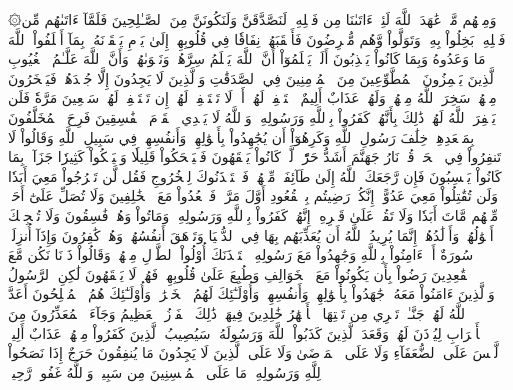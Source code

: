 ۞وَمِنۡهُم مَّنۡ عَٰهَدَ ٱللَّهَ لَئِنۡ ءَاتَىٰنَا مِن فَضۡلِهِۦ لَنَصَّدَّقَنَّ وَلَنَكُونَنَّ مِنَ ٱلصَّـٰلِحِينَ
فَلَمَّآ ءَاتَىٰهُم مِّن فَضۡلِهِۦ بَخِلُواْ بِهِۦ وَتَوَلَّواْ وَّهُم مُّعۡرِضُونَ
فَأَعۡقَبَهُمۡ نِفَاقٗا فِي قُلُوبِهِمۡ إِلَىٰ يَوۡمِ يَلۡقَوۡنَهُۥ بِمَآ أَخۡلَفُواْ ٱللَّهَ مَا وَعَدُوهُ وَبِمَا كَانُواْ يَكۡذِبُونَ
أَلَمۡ يَعۡلَمُوٓاْ أَنَّ ٱللَّهَ يَعۡلَمُ سِرَّهُمۡ وَنَجۡوَىٰهُمۡ وَأَنَّ ٱللَّهَ عَلَّـٰمُ ٱلۡغُيُوبِ
ٱلَّذِينَ يَلۡمِزُونَ ٱلۡمُطَّوِّعِينَ مِنَ ٱلۡمُؤۡمِنِينَ فِي ٱلصَّدَقَٰتِ وَٱلَّذِينَ لَا يَجِدُونَ إِلَّا جُهۡدَهُمۡ فَيَسۡخَرُونَ مِنۡهُمۡ سَخِرَ ٱللَّهُ مِنۡهُمۡ وَلَهُمۡ عَذَابٌ أَلِيمٌ
ٱسۡتَغۡفِرۡ لَهُمۡ أَوۡ لَا تَسۡتَغۡفِرۡ لَهُمۡ إِن تَسۡتَغۡفِرۡ لَهُمۡ سَبۡعِينَ مَرَّةٗ فَلَن يَغۡفِرَ ٱللَّهُ لَهُمۡۚ ذَٰلِكَ بِأَنَّهُمۡ كَفَرُواْ بِٱللَّهِ وَرَسُولِهِۦۗ وَٱللَّهُ لَا يَهۡدِي ٱلۡقَوۡمَ ٱلۡفَٰسِقِينَ
فَرِحَ ٱلۡمُخَلَّفُونَ بِمَقۡعَدِهِمۡ خِلَٰفَ رَسُولِ ٱللَّهِ وَكَرِهُوٓاْ أَن يُجَٰهِدُواْ بِأَمۡوَٰلِهِمۡ وَأَنفُسِهِمۡ فِي سَبِيلِ ٱللَّهِ وَقَالُواْ لَا تَنفِرُواْ فِي ٱلۡحَرِّۗ قُلۡ نَارُ جَهَنَّمَ أَشَدُّ حَرّٗاۚ لَّوۡ كَانُواْ يَفۡقَهُونَ
فَلۡيَضۡحَكُواْ قَلِيلٗا وَلۡيَبۡكُواْ كَثِيرٗا جَزَآءَۢ بِمَا كَانُواْ يَكۡسِبُونَ
فَإِن رَّجَعَكَ ٱللَّهُ إِلَىٰ طَآئِفَةٖ مِّنۡهُمۡ فَٱسۡتَـٔۡذَنُوكَ لِلۡخُرُوجِ فَقُل لَّن تَخۡرُجُواْ مَعِيَ أَبَدٗا وَلَن تُقَٰتِلُواْ مَعِيَ عَدُوًّاۖ إِنَّكُمۡ رَضِيتُم بِٱلۡقُعُودِ أَوَّلَ مَرَّةٖ فَٱقۡعُدُواْ مَعَ ٱلۡخَٰلِفِينَ
وَلَا تُصَلِّ عَلَىٰٓ أَحَدٖ مِّنۡهُم مَّاتَ أَبَدٗا وَلَا تَقُمۡ عَلَىٰ قَبۡرِهِۦٓۖ إِنَّهُمۡ كَفَرُواْ بِٱللَّهِ وَرَسُولِهِۦ وَمَاتُواْ وَهُمۡ فَٰسِقُونَ
وَلَا تُعۡجِبۡكَ أَمۡوَٰلُهُمۡ وَأَوۡلَٰدُهُمۡۚ إِنَّمَا يُرِيدُ ٱللَّهُ أَن يُعَذِّبَهُم بِهَا فِي ٱلدُّنۡيَا وَتَزۡهَقَ أَنفُسُهُمۡ وَهُمۡ كَٰفِرُونَ
وَإِذَآ أُنزِلَتۡ سُورَةٌ أَنۡ ءَامِنُواْ بِٱللَّهِ وَجَٰهِدُواْ مَعَ رَسُولِهِ ٱسۡتَـٔۡذَنَكَ أُوْلُواْ ٱلطَّوۡلِ مِنۡهُمۡ وَقَالُواْ ذَرۡنَا نَكُن مَّعَ ٱلۡقَٰعِدِينَ
رَضُواْ بِأَن يَكُونُواْ مَعَ ٱلۡخَوَالِفِ وَطُبِعَ عَلَىٰ قُلُوبِهِمۡ فَهُمۡ لَا يَفۡقَهُونَ
لَٰكِنِ ٱلرَّسُولُ وَٱلَّذِينَ ءَامَنُواْ مَعَهُۥ جَٰهَدُواْ بِأَمۡوَٰلِهِمۡ وَأَنفُسِهِمۡۚ وَأُوْلَـٰٓئِكَ لَهُمُ ٱلۡخَيۡرَٰتُۖ وَأُوْلَـٰٓئِكَ هُمُ ٱلۡمُفۡلِحُونَ
أَعَدَّ ٱللَّهُ لَهُمۡ جَنَّـٰتٖ تَجۡرِي مِن تَحۡتِهَا ٱلۡأَنۡهَٰرُ خَٰلِدِينَ فِيهَاۚ ذَٰلِكَ ٱلۡفَوۡزُ ٱلۡعَظِيمُ
وَجَآءَ ٱلۡمُعَذِّرُونَ مِنَ ٱلۡأَعۡرَابِ لِيُؤۡذَنَ لَهُمۡ وَقَعَدَ ٱلَّذِينَ كَذَبُواْ ٱللَّهَ وَرَسُولَهُۥۚ سَيُصِيبُ ٱلَّذِينَ كَفَرُواْ مِنۡهُمۡ عَذَابٌ أَلِيمٞ
لَّيۡسَ عَلَى ٱلضُّعَفَآءِ وَلَا عَلَى ٱلۡمَرۡضَىٰ وَلَا عَلَى ٱلَّذِينَ لَا يَجِدُونَ مَا يُنفِقُونَ حَرَجٌ إِذَا نَصَحُواْ لِلَّهِ وَرَسُولِهِۦۚ مَا عَلَى ٱلۡمُحۡسِنِينَ مِن سَبِيلٖۚ وَٱللَّهُ غَفُورٞ رَّحِيمٞ
